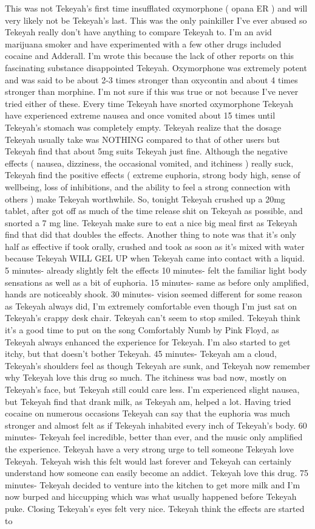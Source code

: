 \documentclass[12pt]{book}
\begin{document}
This was not Tekeyah's first time insufflated oxymorphone ( opana ER ) and will very likely not be Tekeyah's last. This was the only painkiller I've ever abused so Tekeyah really don't have anything to compare Tekeyah to. I'm an avid marijuana smoker and have experimented with a few other drugs included cocaine and Adderall. I'm wrote this because the lack of other reports on this fascinating substance disappointed Tekeyah. Oxymorphone was extremely potent and was said to be about 2-3 times stronger than oxycontin and about 4 times stronger than morphine. I'm not sure if this was true or not because I've never tried either of these. Every time Tekeyah have snorted oxymorphone Tekeyah have experienced extreme nausea and once vomited about 15 times until Tekeyah's stomach was completely empty. Tekeyah realize that the dosage Tekeyah usually take was NOTHING compared to that of other users but Tekeyah find that about 5mg suits Tekeyah just fine. Although the negative effects ( nausea, dizziness, the occasional vomited, and itchiness ) really suck, Tekeyah find the positive effects ( extreme euphoria, strong body high, sense of wellbeing, loss of inhibitions, and the ability to feel a strong connection with others ) make Tekeyah worthwhile. So, tonight Tekeyah crushed up a 20mg tablet, after got off as much of the time release shit on Tekeyah as possible, and snorted a 7 mg line. Tekeyah make sure to eat a nice big meal first as Tekeyah find that did that doubles the effects. Another thing to note was that it's only half as effective if took orally, crushed and took as soon as it's mixed with water because Tekeyah WILL GEL UP when Tekeyah came into contact with a liquid. 5 minutes- already slightly felt the effects 10 minutes- felt the familiar light body sensations as well as a bit of euphoria. 15 minutes- same as before only amplified, hands are noticeably shook. 30 minutes- vision seemed different for some reason as Tekeyah always did, I'm extremely comfortable even though I'm just sat on Tekeyah's crappy desk chair. Tekeyah can't seem to stop smiled. Tekeyah think it's a good time to put on the song Comfortably Numb by Pink Floyd, as Tekeyah always enhanced the experience for Tekeyah. I'm also started to get itchy, but that doesn't bother Tekeyah. 45 minutes- Tekeyah am a cloud, Tekeyah's shoulders feel as though Tekeyah are sunk, and Tekeyah now remember why Tekeyah love this drug so much. The itchiness was bad now, mostly on Tekeyah's face, but Tekeyah still could care less. I'm experienced slight nausea, but Tekeyah find that drank milk, as Tekeyah am, helped a lot. Having tried cocaine on numerous occasions Tekeyah can say that the euphoria was much stronger and almost felt as if Tekeyah inhabited every inch of Tekeyah's body. 60 minutes- Tekeyah feel incredible, better than ever, and the music only amplified the experience. Tekeyah have a very strong urge to tell someone Tekeyah love Tekeyah. Tekeyah wish this felt would last forever and Tekeyah can certainly understand how someone can easily become an addict. Tekeyah love this drug. 75 minutes- Tekeyah decided to venture into the kitchen to get more milk and I'm now burped and hiccupping which was what usually happened before Tekeyah puke. Closing Tekeyah's eyes felt very nice. Tekeyah think the effects are started to 
\end{document}
